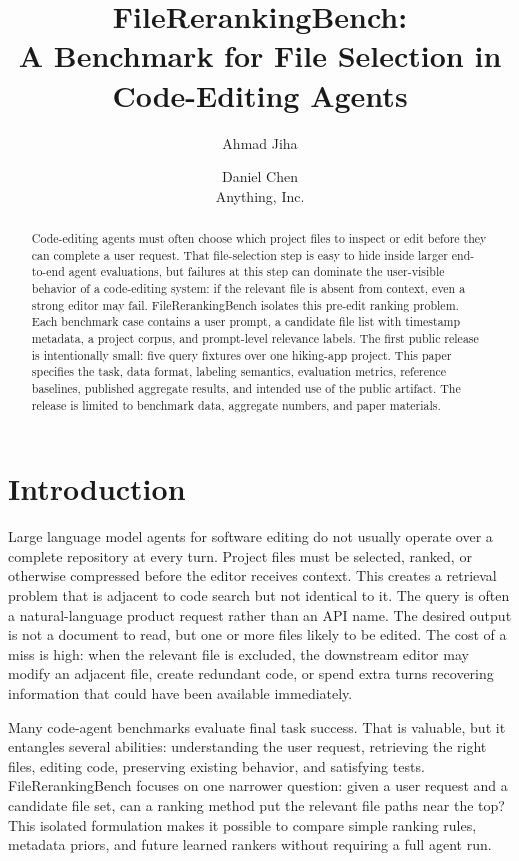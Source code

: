 \documentclass[11pt,a4paper]{article}
\title{\textbf{FileRerankingBench:\\A Benchmark for File Selection in Code-Editing Agents}}
\author{Ahmad Jiha \and Daniel Chen\\Anything, Inc.}
\date{}
\begin{document}
\maketitle

\begin{abstract}
Code-editing agents must often choose which project files to inspect or edit
before they can complete a user request. That file-selection step is easy to
hide inside larger end-to-end agent evaluations, but failures at this step can
dominate the user-visible behavior of a code-editing system: if the relevant
file is absent from context, even a strong editor may fail. FileRerankingBench
isolates this pre-edit ranking problem. Each benchmark case contains a user
prompt, a candidate file list with timestamp metadata, a project corpus, and
prompt-level relevance labels. The first public release is intentionally small:
five query fixtures over one hiking-app project. This paper specifies the task,
data format, labeling semantics, evaluation metrics, reference baselines,
published aggregate results, and intended use of the public artifact. The
release is limited to benchmark data, aggregate numbers, and paper materials.
\end{abstract}

\section{Introduction}

Large language model agents for software editing do not usually operate over a
complete repository at every turn. Project files must be selected, ranked, or
otherwise compressed before the editor receives context. This creates a
retrieval problem that is adjacent to code search but not identical to it. The
query is often a natural-language product request rather than an API name. The
desired output is not a document to read, but one or more files likely to be
edited. The cost of a miss is high: when the relevant file is excluded, the
downstream editor may modify an adjacent file, create redundant code, or spend
extra turns recovering information that could have been available immediately.

Many code-agent benchmarks evaluate final task success. That is valuable, but
it entangles several abilities: understanding the user request, retrieving the
right files, editing code, preserving existing behavior, and satisfying tests.
FileRerankingBench focuses on one narrower question: given a user request and a
candidate file set, can a ranking method put the relevant file paths near the
top? This isolated formulation makes it possible to compare simple ranking
rules, metadata priors, and future learned rankers without requiring a full
agent run.
\end{document}

